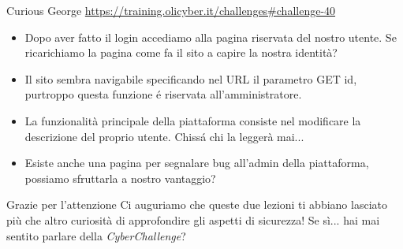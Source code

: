 \documentclass[12pt,handout]{beamer}
\begin{document}
\begin{frame}{Curious George}
    \url{https://training.olicyber.it/challenges\#challenge-40}
    \vfill
    \begin{itemize}
        \item Dopo aver fatto il login accediamo alla pagina riservata del nostro utente. Se ricarichiamo la pagina come fa il sito a capire la nostra identità?
        \pause
        \item Il sito sembra navigabile specificando nel URL il parametro GET id, purtroppo questa funzione é riservata all'amministratore.
        \pause
        \item La funzionalità principale della piattaforma consiste nel modificare la descrizione del proprio utente. Chissá chi la leggerà mai...
        \pause
        \item Esiste anche una pagina per segnalare bug all'admin della piattaforma, possiamo sfruttarla a nostro vantaggio?
        \pause
    \end{itemize}
    \vfill
\end{frame}

\begin{frame}{Grazie per l'attenzione}
Ci auguriamo che queste due lezioni ti abbiano lasciato più che altro curiosità di approfondire gli aspetti di sicurezza!
\vfill
Se sì... hai mai sentito parlare della \textit{CyberChallenge}?
\end{frame}
\end{document}
